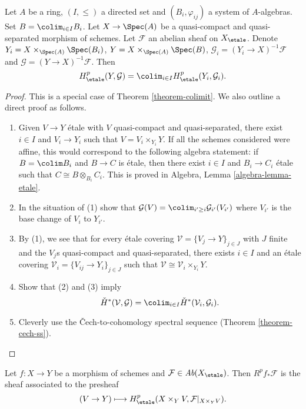 \begin{lemma}
\label{lemma-directed-colimit-cohomology}
Let $A$ be a ring, $(I, \leq)$ a directed set and $(B_i, \varphi_{ij})$ a
system of $A$-algebras. Set $B = \colim_{i\in I} B_i$. Let $X \to \Spec(A)$
be a quasi-compact and quasi-separated morphism of schemes. Let
$\mathcal{F}$ an abelian sheaf on $X_\etale$.
Denote $Y_i = X \times_{\Spec(A)} \Spec(B_i)$,
$Y = X \times_{\Spec(A)} \Spec(B)$,
$\mathcal{G}_i = (Y_i \to X)^{-1}\mathcal{F}$ and
$\mathcal{G} = (Y \to X)^{-1}\mathcal{F}$. Then
$$
H_\etale^p(Y, \mathcal{G}) =
\colim_{i\in I} H_\etale^p (Y_i, \mathcal{G}_i).
$$
\end{lemma}

\begin{proof}
This is a special case of Theorem \ref{theorem-colimit}.
We also outline a direct proof as follows.
\begin{enumerate}
\item Given $V \to Y$ \'etale with $V$ quasi-compact and
quasi-separated, there exist $i\in I$ and $V_i \to Y_i$ such that
$V = V_i \times_{Y_i} Y$.
If all the schemes considered were affine, this would correspond to the
following algebra statement: if $B = \colim B_i$ and $B \to C$ is \'etale,
then there exist $i \in I$ and $B_i \to C_i$ \'etale such that
$C \cong B \otimes_{B_i} C_i$.
This is proved in Algebra, Lemma \ref{algebra-lemma-etale}.
\item In the situation of (1) show that
$\mathcal{G}(V) = \colim_{i' \geq i} \mathcal{G}_{i'}(V_{i'})$
where $V_{i'}$ is the base change of $V_i$ to $Y_{i'}$.
\item By (1), we see that for every \'etale covering
$\mathcal{V} = \{V_j \to Y\}_{j\in J}$ with $J$ finite and the
$V_j$s quasi-compact and quasi-separated, there exists $i \in I$ and
an \'etale covering $\mathcal{V}_i = \{V_{ij} \to Y_i\}_{j \in J}$
such that $\mathcal{V} \cong \mathcal{V}_i \times_{Y_i} Y$.
\item Show that (2) and (3) imply
$$
\check H^*(\mathcal{V}, \mathcal{G})=
\colim_{i\in I} \check H^*(\mathcal{V}_i, \mathcal{G}_i).
$$
\item Cleverly use the {\v C}ech-to-cohomology spectral sequence
(Theorem \ref{theorem-cech-ss}).
\end{enumerate}
\end{proof}

\begin{lemma}
\label{lemma-higher-direct-images}
Let $f: X\to Y$ be a morphism of schemes and $\mathcal{F}\in
\textit{Ab}(X_\etale)$. Then $R^pf_*\mathcal{F}$ is the sheaf
associated to the presheaf
$$
(V \to Y) \longmapsto H_\etale^p(X \times_Y V, \mathcal{F}|_{X \times_Y V}).
$$
\end{lemma}

